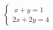 \documentclass[preview]{standalone}
\begin{document}
\begin{align*}
\left\{ \begin{array}{cl} \ x + y = 1 \\[1pt] 2x + 2y = 4 \end{array} \right.
\end{align*}
\end{document}
